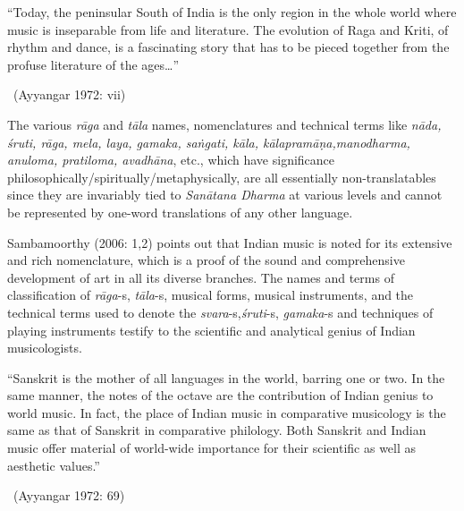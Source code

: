 \begin{myquote}
“Today, the peninsular South of India is the only region in the whole world where music is inseparable from life and literature. The evolution of Raga and Kriti, of rhythm and dance, is a fascinating story that has to be pieced together from the profuse literature of the ages…” 

~\hfill (Ayyangar 1972: vii)
\end{myquote}

The various \textit{rāga} and \textit{tāla} names, nomenclatures and technical terms like \textit{nāda, śruti, rāga, mela, laya, gamaka, saṅgati, kāla, kālapramāṇa,\break manodharma, anuloma, pratiloma, avadhāna}, etc., which have signifi\-cance philosophically/spiritually/metaphysically, are all essentially non-\break translatables since they are invariably tied to \textit{Sanātana Dharma} at various levels and cannot be represented by one-word translations of any other language.

Sambamoorthy (2006: 1,2) points out that Indian music is noted for its extensive and rich nomenclature, which is a proof of the sound and comprehensive development of art in all its diverse branches. The names and terms of classification of \textit{rāga}-s, \textit{tāla}-s, musical forms, musical instruments, and the technical terms used to denote the \textit{svara}-s,\break \textit{śruti}-s, \textit{gamaka}-s and techniques of playing instruments testify to the scientific and analytical genius of Indian musicologists.

\begin{myquote}
“Sanskrit is the mother of all languages in the world, barring one or two. In the same manner, the notes of the octave are the contribution of Indian genius to world music. In fact, the place of Indian music in comparative musicology is the same as that of Sanskrit in comparative philology. Both Sanskrit and Indian music offer material of world-wide importance for their scientific as well as aesthetic values.” 

~\hfill (Ayyangar 1972: 69)
\end{myquote}

